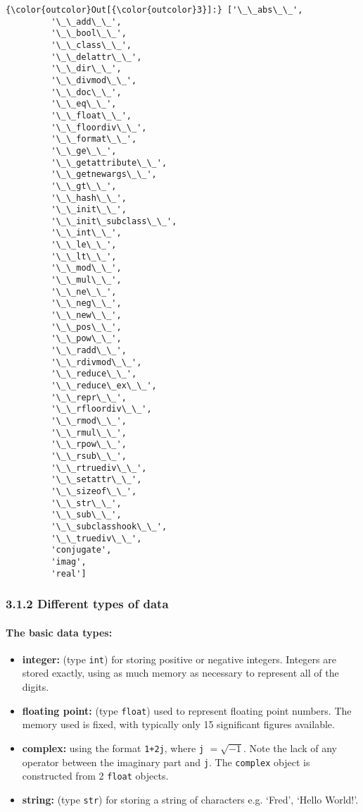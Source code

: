 \documentclass[10pt]{article}
\providecommand{\tightlist}{%
      \setlength{\itemsep}{0pt}\setlength{\parskip}{0pt}}
\begin{document}
\begin{Verbatim}[commandchars=\\\{\}]
{\color{outcolor}Out[{\color{outcolor}3}]:} ['\_\_abs\_\_',
         '\_\_add\_\_',
         '\_\_bool\_\_',
         '\_\_class\_\_',
         '\_\_delattr\_\_',
         '\_\_dir\_\_',
         '\_\_divmod\_\_',
         '\_\_doc\_\_',
         '\_\_eq\_\_',
         '\_\_float\_\_',
         '\_\_floordiv\_\_',
         '\_\_format\_\_',
         '\_\_ge\_\_',
         '\_\_getattribute\_\_',
         '\_\_getnewargs\_\_',
         '\_\_gt\_\_',
         '\_\_hash\_\_',
         '\_\_init\_\_',
         '\_\_init\_subclass\_\_',
         '\_\_int\_\_',
         '\_\_le\_\_',
         '\_\_lt\_\_',
         '\_\_mod\_\_',
         '\_\_mul\_\_',
         '\_\_ne\_\_',
         '\_\_neg\_\_',
         '\_\_new\_\_',
         '\_\_pos\_\_',
         '\_\_pow\_\_',
         '\_\_radd\_\_',
         '\_\_rdivmod\_\_',
         '\_\_reduce\_\_',
         '\_\_reduce\_ex\_\_',
         '\_\_repr\_\_',
         '\_\_rfloordiv\_\_',
         '\_\_rmod\_\_',
         '\_\_rmul\_\_',
         '\_\_rpow\_\_',
         '\_\_rsub\_\_',
         '\_\_rtruediv\_\_',
         '\_\_setattr\_\_',
         '\_\_sizeof\_\_',
         '\_\_str\_\_',
         '\_\_sub\_\_',
         '\_\_subclasshook\_\_',
         '\_\_truediv\_\_',
         'conjugate',
         'imag',
         'real']
\end{Verbatim}
            
    \hypertarget{different-types-of-data}{%
\subsubsection*{3.1.2 Different types of
data}\label{different-types-of-data}}

\hypertarget{the-basic-data-types}{%
\paragraph{The basic data types:}\label{the-basic-data-types}}

\begin{itemize}
\tightlist
\item
  \textbf{integer:} (type \texttt{int}) for storing positive or negative
  integers. Integers are stored exactly, using as much memory as
  necessary to represent all of the digits.
\item
  \textbf{floating point:} (type \texttt{float}) used to represent
  floating point numbers. The memory used is fixed, with typically only
  15 significant figures available.
\item
  \textbf{complex:} using the format \texttt{1+2j}, where \texttt{j}
  \(=\sqrt{-1}\). Note the lack of any operator between the imaginary
  part and \texttt{j}. The \texttt{complex} object is constructed from 2
  \texttt{float} objects.
\item
  \textbf{string:} (type \texttt{str}) for storing a string of
  characters e.g. `Fred', `Hello World!'.
\end{itemize}
\end{document}
